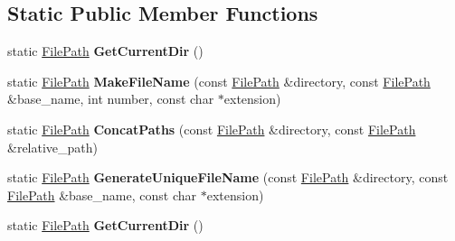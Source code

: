 \subsection*{Static Public Member Functions}
\begin{DoxyCompactItemize}
\item 
\hypertarget{classtesting_1_1internal_1_1_file_path_a0f7b48e493656679cb82a2b679620c4e}{}static \hyperlink{classtesting_1_1internal_1_1_file_path}{File\+Path} {\bfseries Get\+Current\+Dir} ()\label{classtesting_1_1internal_1_1_file_path_a0f7b48e493656679cb82a2b679620c4e}

\item 
\hypertarget{classtesting_1_1internal_1_1_file_path_a1e7793eaae21c6629afe8be11064b111}{}static \hyperlink{classtesting_1_1internal_1_1_file_path}{File\+Path} {\bfseries Make\+File\+Name} (const \hyperlink{classtesting_1_1internal_1_1_file_path}{File\+Path} \&directory, const \hyperlink{classtesting_1_1internal_1_1_file_path}{File\+Path} \&base\+\_\+name, int number, const char $\ast$extension)\label{classtesting_1_1internal_1_1_file_path_a1e7793eaae21c6629afe8be11064b111}

\item 
\hypertarget{classtesting_1_1internal_1_1_file_path_ad58aa6d8b160d0ba0b661f56f0980e26}{}static \hyperlink{classtesting_1_1internal_1_1_file_path}{File\+Path} {\bfseries Concat\+Paths} (const \hyperlink{classtesting_1_1internal_1_1_file_path}{File\+Path} \&directory, const \hyperlink{classtesting_1_1internal_1_1_file_path}{File\+Path} \&relative\+\_\+path)\label{classtesting_1_1internal_1_1_file_path_ad58aa6d8b160d0ba0b661f56f0980e26}

\item 
\hypertarget{classtesting_1_1internal_1_1_file_path_ab22637ea53e3918ec814dc6a5fecd1f9}{}static \hyperlink{classtesting_1_1internal_1_1_file_path}{File\+Path} {\bfseries Generate\+Unique\+File\+Name} (const \hyperlink{classtesting_1_1internal_1_1_file_path}{File\+Path} \&directory, const \hyperlink{classtesting_1_1internal_1_1_file_path}{File\+Path} \&base\+\_\+name, const char $\ast$extension)\label{classtesting_1_1internal_1_1_file_path_ab22637ea53e3918ec814dc6a5fecd1f9}

\item 
\hypertarget{classtesting_1_1internal_1_1_file_path_a0f7b48e493656679cb82a2b679620c4e}{}static \hyperlink{classtesting_1_1internal_1_1_file_path}{File\+Path} {\bfseries Get\+Current\+Dir} ()\label{classtesting_1_1internal_1_1_file_path_a0f7b48e493656679cb82a2b679620c4e}


\end{DoxyCompactItemize}
